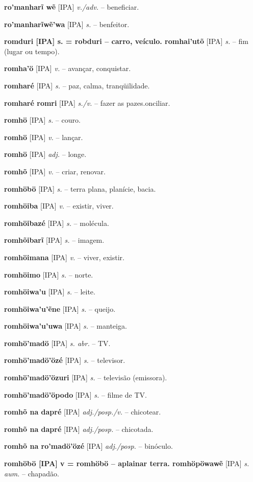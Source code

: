 \textbf{ro'manharĩ wẽ} [IPA] \textit{v./adv.} -- beneficiar.

\textbf{ro'manharĩwẽ'wa} [IPA] \textit{s.} -- benfeitor.

\textbf{romduri [IPA] s. = robduri -- carro, veículo. romhai'utõ} [IPA] \textit{s.} -- fim (lugar ou tempo).

\textbf{romha'ö} [IPA] \textit{v.} -- avançar, conquistar.

\textbf{romharé} [IPA] \textit{s.} -- paz, calma, tranqüilidade.

\textbf{romharé romri} [IPA] \textit{s./v.} -- fazer as pazes.onciliar.

\textbf{romhö} [IPA] \textit{s.} -- couro.

\textbf{romhö} [IPA] \textit{v.} -- lançar.

\textbf{romhö} [IPA] \textit{adj.} -- longe.

\textbf{romhõ} [IPA] \textit{v.} -- criar, renovar.

\textbf{romhöbö} [IPA] \textit{s.} -- terra plana, planície, bacia.

\textbf{romhöiba} [IPA] \textit{v.} -- existir, viver.

\textbf{romhöibazé} [IPA] \textit{s.} -- molécula.

\textbf{romhõibarĩ} [IPA] \textit{s.} -- imagem.

\textbf{romhöimana} [IPA] \textit{v.} -- viver, existir.

\textbf{romhöimo} [IPA] \textit{s.} -- norte.

\textbf{romhöiwa'u} [IPA] \textit{s.} -- leite.

\textbf{romhöiwa'u'ẽne} [IPA] \textit{s.} -- queijo.

\textbf{romhöiwa'u'uwa} [IPA] \textit{s.} -- manteiga.

\textbf{romhö'madö} [IPA] \textit{s. abr.} -- TV.

\textbf{romhö'madö'özé} [IPA] \textit{s.} -- televisor.

\textbf{romhö'madö'özuri} [IPA] \textit{s.} -- televisão (emissora).

\textbf{romhö'madö'öpodo} [IPA] \textit{s.} -- filme de TV.

\textbf{romhõ na dapré} [IPA] \textit{adj./posp./v.} -- chicotear.

\textbf{romhõ na dapré} [IPA] \textit{adj./posp.} -- chicotada.

\textbf{romhõ na ro'madö'özé} [IPA] \textit{adj./posp.} -- binóculo.

\textbf{romhöbö [IPA] v = romhöbö -- aplainar terra. romhöpöwawẽ} [IPA] \textit{s. aum.} -- chapadão.

